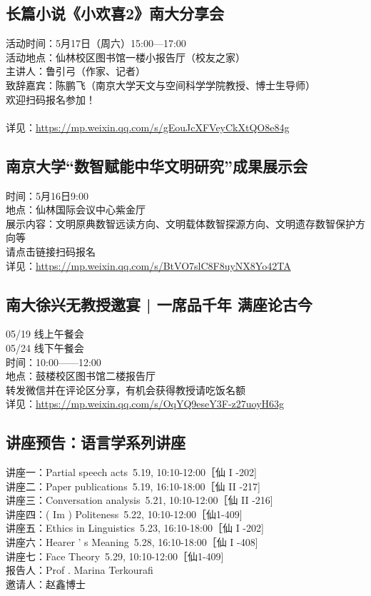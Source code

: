 \documentclass[letterpaper, 12pt]{article}
\begin{document}
\begin{multicols}{2}
\subsection{长篇小说《小欢喜2》南大分享会} %
活动时间：5月17日（周六）15:00—17:00
\\活动地点：仙林校区图书馆一楼小报告厅（校友之家）
\\主讲人：鲁引弓（作家、记者）
\\致辞嘉宾：陈鹏飞（南京大学天文与空间科学学院教授、博士生导师）
\\欢迎扫码报名参加！
\\
\\详见：\url{https://mp.weixin.qq.com/s/gEouJcXFVeyCkXtQO8e84g}

\subsection{南京大学“数智赋能中华文明研究”成果展示会} %
时间：5月16日9:00
\\地点：仙林国际会议中心紫金厅
\\展示内容：文明原典数智远读方向、文明载体数智探源方向、文明遗存数智保护方向等
\\请点击链接扫码报名
\\详见：\url{https://mp.weixin.qq.com/s/BtVO7slC8F8uyNX8Yo42TA}
\subsection{南大徐兴无教授邀宴 | 一席品千年 满座论古今} %
05/19 线上午餐会 
\\05/24 线下午餐会
\\时间：10:00——12:00
\\地点：鼓楼校区图书馆二楼报告厅
\\转发微信并在评论区分享，有机会获得教授请吃饭名额
\\详见：\url{https://mp.weixin.qq.com/s/OqYQ9eseY3F-z27uoyH63g}

\subsection{讲座预告：语言学系列讲座}
讲座一：Partial speech acts 5.19, 10:10-12:00［仙 I -202]
\\讲座二：Paper publications 5.19, 16:10-18:00［仙 II -217]
\\讲座三：Conversation analysis 5.21, 10:10-12:00［仙 II -216]
\\讲座四：( Im ) Politeness 5.22, 10:10-12:00［仙1-409]
\\讲座五：Ethics in Linguistics 5.23, 16:10-18:00［仙 I -202]
\\讲座六：Hearer ' s Meaning 5.28, 16:10-18:00［仙 I -408]
\\讲座七：Face Theory 5.29, 10:10-12:00［仙1-409] 
\\报告人：Prof . Marina Terkourafi 
\\邀请人：赵鑫博士


\end{multicols}
\end{document}

